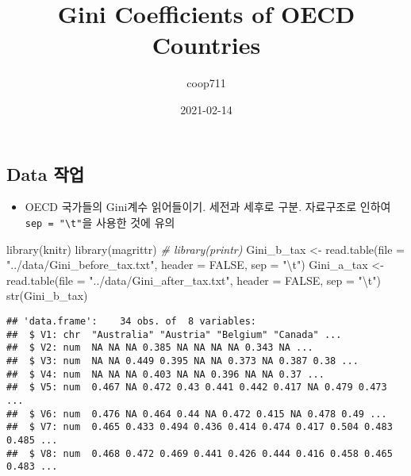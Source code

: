 \documentclass[
]{article}
\title{Gini Coefficients of OECD Countries}
\author{coop711}
\date{2021-02-14}
\newenvironment{Shaded}{\begin{snugshade}}{\end{snugshade}}
\newcommand{\AttributeTok}[1]{\textcolor[rgb]{0.77,0.63,0.00}{#1}}
\newcommand{\CommentTok}[1]{\textcolor[rgb]{0.56,0.35,0.01}{\textit{#1}}}
\newcommand{\ConstantTok}[1]{\textcolor[rgb]{0.00,0.00,0.00}{#1}}
\newcommand{\FunctionTok}[1]{\textcolor[rgb]{0.00,0.00,0.00}{#1}}
\newcommand{\NormalTok}[1]{#1}
\newcommand{\OtherTok}[1]{\textcolor[rgb]{0.56,0.35,0.01}{#1}}
\newcommand{\SpecialCharTok}[1]{\textcolor[rgb]{0.00,0.00,0.00}{#1}}
\newcommand{\StringTok}[1]{\textcolor[rgb]{0.31,0.60,0.02}{#1}}
\providecommand{\tightlist}{%
  \setlength{\itemsep}{0pt}\setlength{\parskip}{0pt}}
\begin{document}
\maketitle

\hypertarget{data-uxc791uxc5c5}{%
\subsection{Data 작업}\label{data-uxc791uxc5c5}}

\begin{itemize}
\tightlist
\item
  OECD 국가들의 Gini계수 읽어들이기. 세전과 세후로 구분. 자료구조로
  인하여 \texttt{sep\ =\ "\textbackslash{}t"}을 사용한 것에 유의
\end{itemize}

\begin{Shaded}
\begin{Highlighting}[]
\FunctionTok{library}\NormalTok{(knitr)}
\FunctionTok{library}\NormalTok{(magrittr)}
\CommentTok{\# library(printr)}
\NormalTok{Gini\_b\_tax }\OtherTok{\textless{}{-}} \FunctionTok{read.table}\NormalTok{(}\AttributeTok{file =} \StringTok{"../data/Gini\_before\_tax.txt"}\NormalTok{, }
                         \AttributeTok{header =} \ConstantTok{FALSE}\NormalTok{, }
                         \AttributeTok{sep =} \StringTok{"}\SpecialCharTok{\textbackslash{}t}\StringTok{"}\NormalTok{)}
\NormalTok{Gini\_a\_tax }\OtherTok{\textless{}{-}} \FunctionTok{read.table}\NormalTok{(}\AttributeTok{file =} \StringTok{"../data/Gini\_after\_tax.txt"}\NormalTok{, }
                         \AttributeTok{header =} \ConstantTok{FALSE}\NormalTok{, }
                         \AttributeTok{sep =} \StringTok{"}\SpecialCharTok{\textbackslash{}t}\StringTok{"}\NormalTok{)}
\FunctionTok{str}\NormalTok{(Gini\_b\_tax)}
\end{Highlighting}
\end{Shaded}

\begin{verbatim}
## 'data.frame':    34 obs. of  8 variables:
##  $ V1: chr  "Australia" "Austria" "Belgium" "Canada" ...
##  $ V2: num  NA NA NA 0.385 NA NA NA NA 0.343 NA ...
##  $ V3: num  NA NA 0.449 0.395 NA NA 0.373 NA 0.387 0.38 ...
##  $ V4: num  NA NA NA 0.403 NA NA 0.396 NA NA 0.37 ...
##  $ V5: num  0.467 NA 0.472 0.43 0.441 0.442 0.417 NA 0.479 0.473 ...
##  $ V6: num  0.476 NA 0.464 0.44 NA 0.472 0.415 NA 0.478 0.49 ...
##  $ V7: num  0.465 0.433 0.494 0.436 0.414 0.474 0.417 0.504 0.483 0.485 ...
##  $ V8: num  0.468 0.472 0.469 0.441 0.426 0.444 0.416 0.458 0.465 0.483 ...
\end{verbatim}
\end{document}
